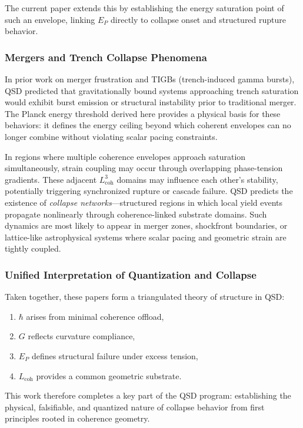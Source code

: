 \documentclass[entropy,article,submit,pdftex,moreauthors]{Definitions/mdpi}
\begin{document}
The current paper extends this by establishing the energy saturation point of such an envelope, linking $E_P$ directly to collapse onset and structured rupture behavior.

\subsubsection{Mergers and Trench Collapse Phenomena}

In prior work on merger frustration and TIGBs (trench-induced gamma bursts), QSD predicted that gravitationally bound systems approaching trench saturation would exhibit burst emission or structural instability prior to traditional merger. The Planck energy threshold derived here provides a physical basis for these behaviors: it defines the energy ceiling beyond which coherent envelopes can no longer combine without violating scalar pacing constraints.

In regions where multiple coherence envelopes approach saturation simultaneously, strain coupling may occur through overlapping phase-tension gradients. These adjacent $L_{\text{coh}}^3$ domains may influence each other's stability, potentially triggering synchronized rupture or cascade failure. QSD predicts the existence of \textit{collapse networks}—structured regions in which local yield events propagate nonlinearly through coherence-linked substrate domains. Such dynamics are most likely to appear in merger zones, shockfront boundaries, or lattice-like astrophysical systems where scalar pacing and geometric strain are tightly coupled.


\subsubsection{Unified Interpretation of Quantization and Collapse}
Taken together, these papers form a triangulated theory of structure in QSD:
\begin{enumerate}
  \item $\hbar$ arises from minimal coherence offload,
  \item $G$ reflects curvature compliance,
  \item $E_P$ defines structural failure under excess tension,
  \item $L_{\text{coh}}$ provides a common geometric substrate.
\end{enumerate}

This work therefore completes a key part of the QSD program: establishing the physical, falsifiable, and quantized nature of collapse behavior from first principles rooted in coherence geometry.
\end{document}
